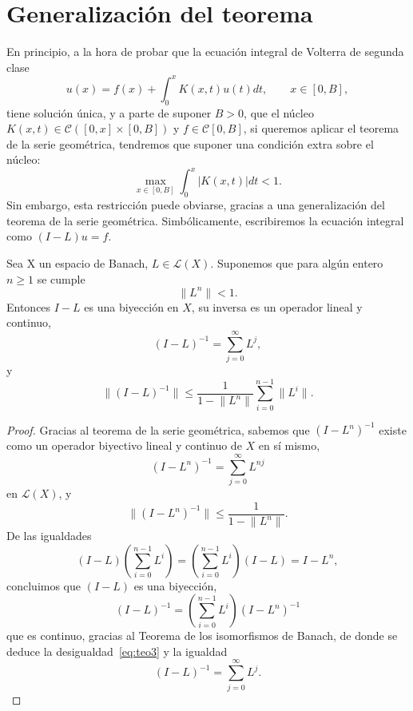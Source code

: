 \section{Generalización del teorema}
En principio, a la hora de probar que la ecuación integral de Volterra de segunda clase
\begin{equation}
	u(x) = f(x) + \int_{0}^{x} K(x,t)u(t)dt, \qquad x \in [0,B],
\end{equation}
tiene solución única, y a parte de suponer $B > 0$, que el núcleo $K(x,t) \in \mathcal{C}([0,x]\times[0,B])$ y $f \in \mathcal{C}[0,B]$, si queremos aplicar el teorema de la serie geométrica, tendremos que suponer una condición extra sobre el núcleo:
\begin{equation}
	\max_{x\in [0,B]}\int_{0}^{x} |K(x,t)|dt < 1.
\end{equation}
Sin embargo, esta restricción puede obviarse, gracias a una generalización del teorema de la serie geométrica. Simbólicamente, escribiremos la ecuación integral como $(I-L)u = f$.
\begin{corolario}\label{corolario}
	Sea X un espacio de Banach, $L \in \mathcal{L}(X)$. Suponemos que para algún entero $n \geqslant 1$ se cumple
	\begin{equation}
		\lVert L^n \rVert < 1.
	\end{equation}
	Entonces $I - L$ es una biyección en $X$, su inversa es un operador lineal y continuo,
	\begin{equation}
		(I-L)^{-1}=\sum_{j=0}^{\infty}L^j, 
	\end{equation}
	y
	\begin{equation}\label{eq:teo3}
		\lVert (I-L)^{-1} \rVert \leqslant \dfrac{1}{1 - \lVert L^n \rVert} \sum_{i=0}^{n - 1}\lVert L^i \rVert.
	\end{equation}
\end{corolario}
\begin{proof}
	Gracias al teorema de la serie geométrica, sabemos que $(I-L^n)^{-1}$ existe como un operador biyectivo lineal y continuo de $X$ en sí mismo,
	\begin{equation}
		(I - L^n)^{-1} = \sum_{j=0}^{\infty}L^{nj} 
	\end{equation}
	en $\mathcal{L}(X)$, y
	\begin{equation}
		\lVert (I - L^n)^{-1} \rVert \leqslant \dfrac{1}{1 - \lVert L^n \rVert}.
	\end{equation}
	De las igualdades
	\begin{equation}
		(I - L)(\sum_{i=0}^{n - 1}L^i) = (\sum_{i=0}^{n - 1}L^i)(I-L) = I - L^n,
	\end{equation}
	concluimos que $(I-L)$ es una biyección,
	\begin{equation}
		(I-L)^{-1} = (\sum_{i=0}^{n-1}L^i)(I-L^n)^{-1}
	\end{equation}
	que es continuo, gracias al Teorema de los isomorfismos de Banach, de donde se deduce la desigualdad~\eqref{eq:teo3} y la igualdad
	\begin{equation}
		(I-L)^{-1}=\sum_{j=0}^{\infty}L^j.
	\end{equation}
\end{proof}
